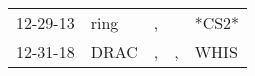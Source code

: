 \begin{supertabular}{lllll}
 12-29-13 &  ring &  , &    &  *CS2* \\
 12-31-18 &  DRAC &  , &  , &   WHIS \\
\end{supertabular}
